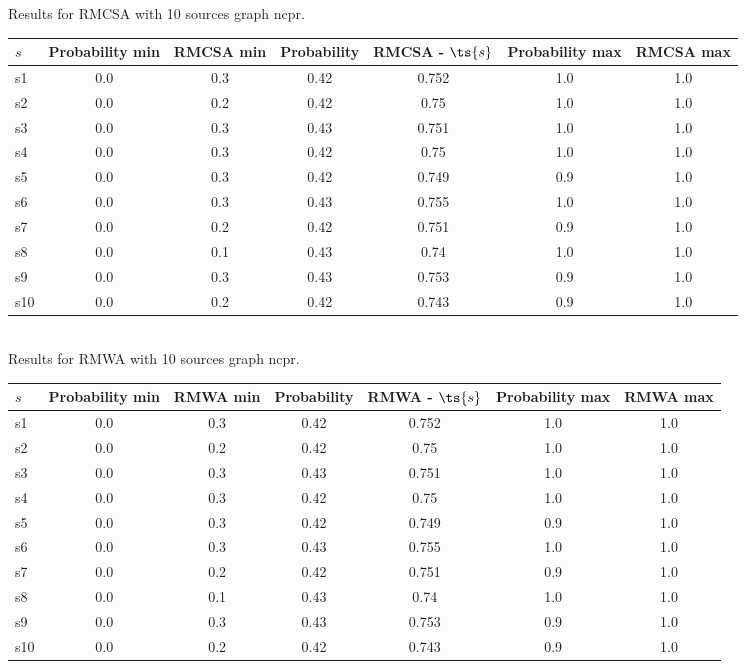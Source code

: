 \documentclass{article}
\begin{document}
\noindent Results for RMCSA with 10 sources graph ncpr.

\noindent\begin{tabular}{|l|c|c|c|c|c|c|}
\hline
$s$& Probability min & RMCSA min & Probability & RMCSA - $\ts{s}$ & Probability max & RMCSA max\\
\hline
s1 &0.0 & 0.3 & 0.42 & 0.752 & 1.0 & 1.0\\
\hline
s2 &0.0 & 0.2 & 0.42 & 0.75 & 1.0 & 1.0\\
\hline
s3 &0.0 & 0.3 & 0.43 & 0.751 & 1.0 & 1.0\\
\hline
s4 &0.0 & 0.3 & 0.42 & 0.75 & 1.0 & 1.0\\
\hline
s5 &0.0 & 0.3 & 0.42 & 0.749 & 0.9 & 1.0\\
\hline
s6 &0.0 & 0.3 & 0.43 & 0.755 & 1.0 & 1.0\\
\hline
s7 &0.0 & 0.2 & 0.42 & 0.751 & 0.9 & 1.0\\
\hline
s8 &0.0 & 0.1 & 0.43 & 0.74 & 1.0 & 1.0\\
\hline
s9 &0.0 & 0.3 & 0.43 & 0.753 & 0.9 & 1.0\\
\hline
s10 &0.0 & 0.2 & 0.42 & 0.743 & 0.9 & 1.0\\
\hline
\end{tabular}\\

\noindent Results for RMWA with 10 sources graph ncpr.

\noindent\begin{tabular}{|l|c|c|c|c|c|c|}
\hline
$s$& Probability min & RMWA min & Probability & RMWA - $\ts{s}$ & Probability max & RMWA max\\
\hline
s1 &0.0 & 0.3 & 0.42 & 0.752 & 1.0 & 1.0\\
\hline
s2 &0.0 & 0.2 & 0.42 & 0.75 & 1.0 & 1.0\\
\hline
s3 &0.0 & 0.3 & 0.43 & 0.751 & 1.0 & 1.0\\
\hline
s4 &0.0 & 0.3 & 0.42 & 0.75 & 1.0 & 1.0\\
\hline
s5 &0.0 & 0.3 & 0.42 & 0.749 & 0.9 & 1.0\\
\hline
s6 &0.0 & 0.3 & 0.43 & 0.755 & 1.0 & 1.0\\
\hline
s7 &0.0 & 0.2 & 0.42 & 0.751 & 0.9 & 1.0\\
\hline
s8 &0.0 & 0.1 & 0.43 & 0.74 & 1.0 & 1.0\\
\hline
s9 &0.0 & 0.3 & 0.43 & 0.753 & 0.9 & 1.0\\
\hline
s10 &0.0 & 0.2 & 0.42 & 0.743 & 0.9 & 1.0\\
\hline
\end{tabular}\\
\end{document}

